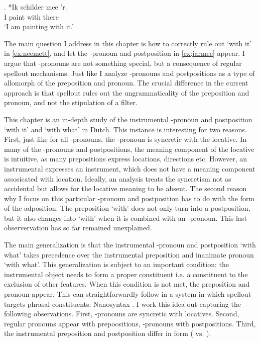 \documentclass[12pt]{article}
\begin{document}
\exg. *Ik schilder mee 'r.\\
 I paint with there\\
 `I am painting with it.'\label{ex:neemeer}

The main question I address in this chapter is how to correctly rule out  `with it' in \ref{ex:neemett}, and let the -pronoun and postposition in \ref{ex:jarmee} appear. I argue that -pronouns are not something special, but a consequence of regular spellout mechanisms. Just like \citet{riemsdijk1978} I analyze -pronouns and postpositions as a type of allomorph of the preposition and pronoun. The crucial difference in the current approach is that spellout rules out the ungrammaticality of the preposition and pronoun, and not the stipulation of a filter.

This chapter is an in-depth study of the instrumental -pronoun and postposition  `with it' and  `with what' in Dutch. This instance is interesting for two reasons. First, just like for all -pronouns, the -pronoun is syncretic with the locative. In many of the -pronouns and postpositions, the meaning component of the locative is intuitive, as many prepositions express locations, directions etc. However, an instrumental expresses an instrument, which does not have a meaning component assosicated with location. Ideally, an analysis treats the syncretism not as accidental but allows for the locative meaning to be absent.
The second reason why I focus on this particular -pronoun and postposition has to do with the form of the adposition. The preposition  `with' does not only turn into a postposition, but it also changes into  `with' when it is combined with an -pronoun. This last observervation has so far remained unexplained.

The main generalization is that the instrumental -pronoun and postposition  `with what' takes precedence over the instrumental preposition and inanimate pronoun  `with what'. This generalization is subject to an important condition: the instrumental object needs to form a proper constituent i.e. a constituent to the exclusion of other features. When this condition is not met, the preposition and pronoun appear. This can straightforwardly follow in a system in which spellout targets phrasal constituents: Nanosyntax \citep{starke2009}. I work this idea out capturing the following observations. First, -pronouns are syncretic with locatives. Second, regular pronouns appear with prepoositions, -pronouns with postpositions. Third, the instrumental preposition and postposition differ in form ( vs. ).
\end{document}
